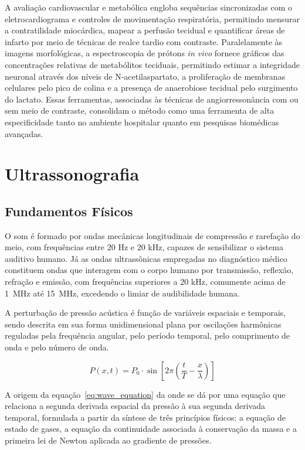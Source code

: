 \documentclass[a4paper,12pt,oneside,openright]{abntex2}
\begin{document}
A avaliação cardiovascular e metabólica engloba sequências sincronizadas com o eletrocardiograma e controles de movimentação respiratória, permitindo mensurar a contratilidade miocárdica, mapear a perfusão tecidual e quantificar áreas de infarto por meio de técnicas de realce tardio com contraste. Paralelamente às imagens morfológicas, a espectroscopia de prótons \textit{in vivo} fornece gráficos das concentrações relativas de metabólitos teciduais, permitindo estimar a integridade neuronal através dos níveis de N-acetilaspartato, a proliferação de membranas celulares pelo pico de colina e a presença de anaerobiose tecidual pelo surgimento do lactato. Essas ferramentas, associadas às técnicas de angiorressonância com ou sem meio de contraste, consolidam o método como uma ferramenta de alta especificidade tanto no ambiente hospitalar quanto em pesquisas biomédicas avançadas.

\chapter{Ultrassonografia}

\section{Fundamentos Físicos}

O som é formado por ondas mecânicas longitudinais de compressão e rarefação do meio, com frequências entre 20 Hz e 20 kHz, capazes de sensibilizar o sistema auditivo humano. Já as ondas ultrassônicas empregadas no diagnóstico médico constituem ondas que interagem com o corpo humano por transmissão, reflexão, refração e emissão, com frequências superiores a 20 kHz, comumente acima de 1~MHz até 15~MHz, excedendo o limiar de audibilidade humana. 

A perturbação de pressão acústica é função de variáveis espaciais e temporais, sendo descrita em sua forma unidimensional plana por oscilações harmônicas reguladas pela frequência angular, pelo período temporal, pelo comprimento de onda e pelo número de onda. 

\begin{equation}
  P(x,t) = P_0 \cdot \sin[2 \pi (\frac{t}{T} - \frac{x}{\lambda})]
\end{equation}

A origem da equação~\eqref{eq:wave_equation} da onde se dá por uma equação que relaciona a segunda derivada espacial da pressão à sua segunda derivada temporal, formulada a partir da síntese de três princípios físicos: a equação de estado de gases, a equação da continuidade associada à conservação da massa e a primeira lei de Newton aplicada ao gradiente de pressões. 
\end{document}
